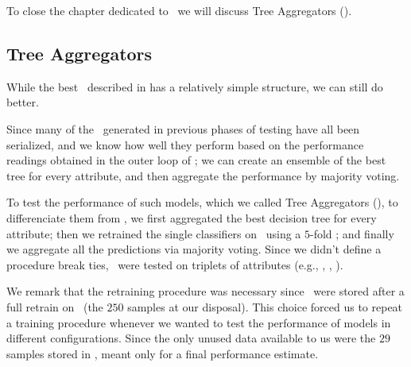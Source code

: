 To close the chapter dedicated to \qrp\ we will discuss Tree Aggregators (\tas).

\subsection{Tree Aggregators}
\label{sec:qrp-ta}
While the best \rf\ described in  has a relatively simple structure, we can still do better.

Since many of the \dts\ generated in previous phases of testing have all been serialized, and we
know how well they perform based on the performance readings obtained in the outer loop of \ncv; we
can create an ensemble of the best tree for every attribute, and then aggregate the performance by majority voting.

To test the performance of such models, which we called Tree Aggregators (\tas), to differenciate them from
\rfs, we first aggregated the best decision tree for every attribute; then we retrained the
single classifiers on \dr\ using a $5$-fold \cv; and finally we aggregate all the predictions via
majority voting. Since we didn't define a procedure break ties, \tas\ were tested on triplets of
attributes (e.g., \an, \bn, \cnmod).

We remark that the retraining procedure was necessary since \dts\ were stored after a full retrain on
\dr\ (the $250$ samples at our disposal). This choice forced us to repeat a
training procedure whenever we wanted to test the performance of models in different configurations.
Since the only unused data available to us were the $29$ samples stored in \db, meant only for a
final performance estimate.

